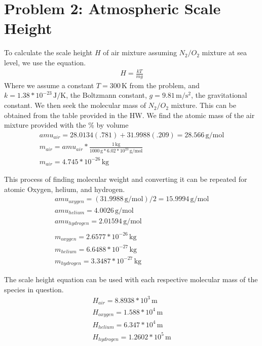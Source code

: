 \documentclass[11pt]{article}
\begin{document}
\newpage
\section*{Problem 2: Atmospheric Scale Height}
\hspace*{2em}To calculate the scale height $H$ of air mixture assuming $N_2/O_2$ mixture
at sea level, we use the equation.
\[
\begin{gathered}
H = \frac{kT}{mg}
\end{gathered}
\]
\hspace*{2em}Where we assume a constant $T = 300 \, \mathrm{K}$ from the problem, and $k = 1.38*10^{-23} \, \mathrm{J/K}$,
the Boltzmann constant, $g = 9.81 \, \mathrm{m/s^2}$, the gravitational constant. We then 
seek the molecular mass of $N_2/O_2$ mixture. This can be obtained from the table provided
in the HW. We find the atomic mass of the air mixture provided with the \% by volume
\[
\begin{gathered}
amu_{air} = 28.0134\left(.781\right)+31.9988\left(.209\right) = 28.566\, \mathrm{g/mol} \\
m_{air} = amu_{air}*\frac{1 \, \mathrm{kg}}{1000\, \mathrm{g} * 6.02*10^{23}\, \mathrm{g/mol}} \\
m_{air} = 4.745*10^{-26} \, \mathrm{kg}
\end{gathered}
\]

\hspace*{2em}This process of finding molecular weight and converting it can be repeated for
atomic Oxygen, helium, and hydrogen. 
\[
\begin{gathered}
amu_{oxygen} = (31.9988 \, \mathrm{g/mol}) / 2 = 15.9994 \, \mathrm{g/mol} \\
amu_{helium} = 4.0026  \, \mathrm{g/mol} \\
amu_{hydrogen} = 2.01594  \, \mathrm{g/mol}
\\
\\
m_{oxygen} = 2.6577*10^{-26} \, \mathrm{kg} \\
m_{helium} = 6.6488*10^{-27} \, \mathrm{kg} \\
m_{hydrogen} = 3.3487*10^{-27} \, \mathrm{kg}
\end{gathered}
\]

\hspace*{2em}The scale height equation can be used with each respective molecular mass of
the species in question.
\[
\begin{gathered}
\boxed{H_{air} = 8.8938*10^3 \, \mathrm{m}} \\
\boxed{H_{oxygen} = 1.588*10^4 \, \mathrm{m}} \\
\boxed{H_{helium} = 6.347*10^4 \, \mathrm{m}} \\
\boxed{H_{hydrogen} = 1.2602*10^5 \, \mathrm{m}}
\end{gathered}
\]
\end{document}

